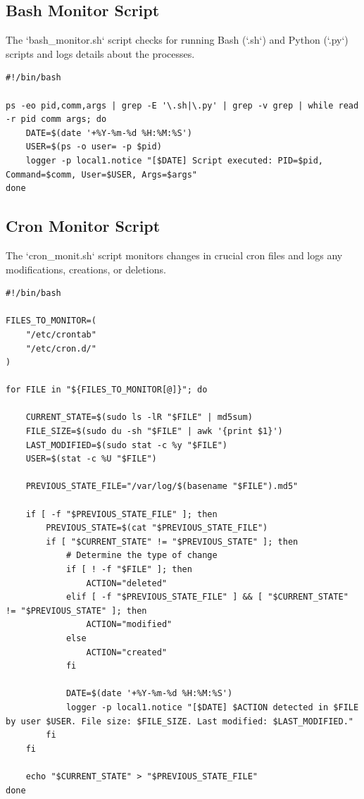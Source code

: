 \documentclass[Master,BMR,english]{twbook}
\begin{document}
\subsection{Bash Monitor Script}
The `bash\_monitor.sh` script checks for running Bash (`.sh`) and Python (`.py`) scripts and logs details about the processes.

\begin{verbatim}
#!/bin/bash

ps -eo pid,comm,args | grep -E '\.sh|\.py' | grep -v grep | while read -r pid comm args; do
    DATE=$(date '+%Y-%m-%d %H:%M:%S')
    USER=$(ps -o user= -p $pid)
    logger -p local1.notice "[$DATE] Script executed: PID=$pid, Command=$comm, User=$USER, Args=$args"
done
\end{verbatim}

\subsection{Cron Monitor Script}
The `cron\_monit.sh` script monitors changes in crucial cron files and logs any modifications, creations, or deletions.

\begin{verbatim}
#!/bin/bash

FILES_TO_MONITOR=(
    "/etc/crontab"
    "/etc/cron.d/"
)

for FILE in "${FILES_TO_MONITOR[@]}"; do

    CURRENT_STATE=$(sudo ls -lR "$FILE" | md5sum)
    FILE_SIZE=$(sudo du -sh "$FILE" | awk '{print $1}')
    LAST_MODIFIED=$(sudo stat -c %y "$FILE")
    USER=$(stat -c %U "$FILE")

    PREVIOUS_STATE_FILE="/var/log/$(basename "$FILE").md5"

    if [ -f "$PREVIOUS_STATE_FILE" ]; then
        PREVIOUS_STATE=$(cat "$PREVIOUS_STATE_FILE")
        if [ "$CURRENT_STATE" != "$PREVIOUS_STATE" ]; then
            # Determine the type of change
            if [ ! -f "$FILE" ]; then
                ACTION="deleted"
            elif [ -f "$PREVIOUS_STATE_FILE" ] && [ "$CURRENT_STATE" != "$PREVIOUS_STATE" ]; then
                ACTION="modified"
            else
                ACTION="created"
            fi

            DATE=$(date '+%Y-%m-%d %H:%M:%S')
            logger -p local1.notice "[$DATE] $ACTION detected in $FILE by user $USER. File size: $FILE_SIZE. Last modified: $LAST_MODIFIED."
        fi
    fi

    echo "$CURRENT_STATE" > "$PREVIOUS_STATE_FILE"
done
\end{verbatim}
\end{document}

